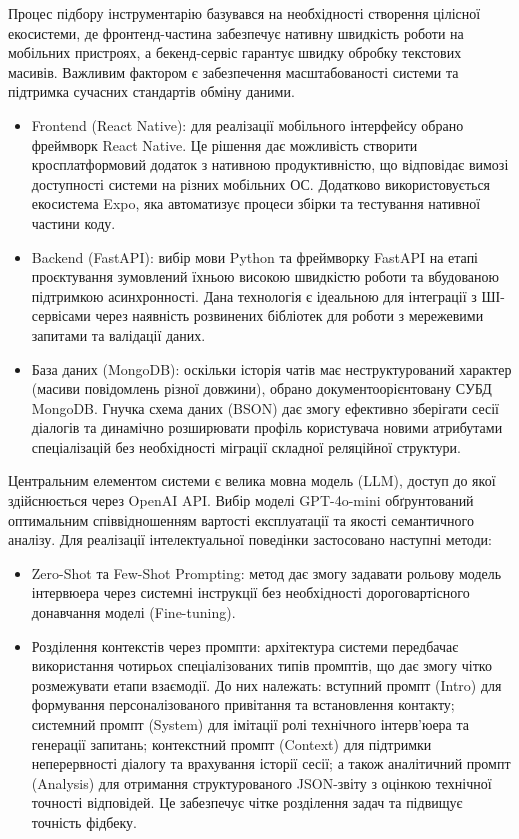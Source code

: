 \documentclass[
]{article}
\begin{document}
Процес підбору інструментарію базувався на необхідності створення
цілісної екосистеми, де фронтенд-частина забезпечує нативну швидкість
роботи на мобільних пристроях, а бекенд-сервіс гарантує швидку обробку
текстових масивів. Важливим фактором є забезпечення масштабованості
системи та підтримка сучасних стандартів обміну даними.

\begin{itemize}
\item
  Frontend (React Native): для реалізації мобільного інтерфейсу обрано
  фреймворк React Native. Це рішення дає можливість створити
  кросплатформовий додаток з нативною продуктивністю, що відповідає
  вимозі доступності системи на різних мобільних ОС. Додатково
  використовується екосистема Expo, яка автоматизує процеси збірки та
  тестування нативної частини коду.
\item
  Backend (FastAPI): вибір мови Python та фреймворку FastAPI на етапі
  проєктування зумовлений їхньою високою швидкістю роботи та вбудованою
  підтримкою асинхронності. Дана технологія є ідеальною для інтеграції з
  ШІ-сервісами через наявність розвинених бібліотек для роботи з
  мережевими запитами та валідації даних.
\item
  База даних (MongoDB): оскільки історія чатів має неструктурований
  характер (масиви повідомлень різної довжини), обрано
  документоорієнтовану СУБД MongoDB. Гнучка схема даних (BSON) дає змогу
  ефективно зберігати сесії діалогів та динамічно розширювати профіль
  користувача новими атрибутами спеціалізацій без необхідності міграції
  складної реляційної структури.
\end{itemize}

Центральним елементом системи є велика мовна модель (LLM), доступ до
якої здійснюється через OpenAI API. Вибір моделі GPT-4o-mini
обґрунтований оптимальним співвідношенням вартості експлуатації та
якості семантичного аналізу. Для реалізації інтелектуальної поведінки
застосовано наступні методи:

\begin{itemize}
\item
  Zero-Shot та Few-Shot Prompting: метод дає змогу задавати рольову
  модель інтерв\textquotesingle юера через системні інструкції без
  необхідності дороговартісного донавчання моделі (Fine-tuning).
\item
  Розділення контекстів через промпти: архітектура системи передбачає
  використання чотирьох спеціалізованих типів промптів, що дає змогу
  чітко розмежувати етапи взаємодії. До них належать: вступний промпт
  (Intro) для формування персоналізованого привітання та встановлення
  контакту; системний промпт (System) для імітації ролі технічного
  інтерв'юера та генерації запитань; контекстний промпт (Context) для
  підтримки неперервності діалогу та врахування історії сесії; а також
  аналітичний промпт (Analysis) для отримання структурованого JSON-звіту
  з оцінкою технічної точності відповідей. Це забезпечує чітке
  розділення задач та підвищує точність фідбеку.
\end{itemize}
\end{document}
